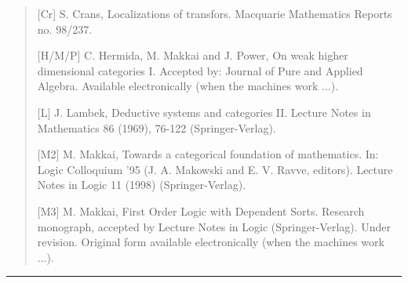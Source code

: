 \begin{quote}
[Cr]	S. Crans, Localizations of transfors. Macquarie Mathematics
Reports no. 98/237. 

[H/M/P]	C. Hermida, M. Makkai and J. Power, On weak higher dimensional
categories I. Accepted by: Journal of Pure and Applied Algebra. Available
electronically (when the machines work ...).

[L]	J. Lambek, Deductive systems and categories II. Lecture Notes in
Mathematics 86 (1969), 76-122 (Springer-Verlag). 

[M2]	M. Makkai, Towards a categorical foundation of mathematics. In:
Logic Colloquium '95 (J. A. Makowski and E. V. Ravve, editors). Lecture
Notes in Logic 11 (1998) (Springer-Verlag). 

[M3]	M. Makkai, First Order Logic with Dependent Sorts. Research
monograph, accepted by Lecture Notes in Logic (Springer-Verlag). Under
revision. Original form available electronically (when the machines
work ...). 

\end{quote}


 \par\noindent\rule{\textwidth}{0.4pt}


